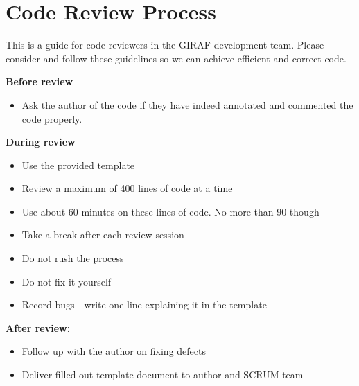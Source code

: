 \chapter{Code Review Process}\label{CRP}
This is a guide for code reviewers in the GIRAF development team. Please
consider and follow these guidelines so we can achieve efficient and correct
code.\nl

\textbf{Before review}
  \begin{itemize}
    \item Ask the author of the code if they have indeed annotated and commented
    the code properly.
  \end{itemize}
\textbf{During review}
  \begin{itemize}
    \item Use the provided template
    \item Review a maximum of 400 lines of code at a time
    \item Use about 60 minutes on these lines of code. No more than 90 though
    \item Take a break after each review session
    \item Do not rush the process
    \item Do not fix it yourself
    \item Record bugs - write one line explaining it in the template 
  \end{itemize}
\textbf{After review:}
  \begin{itemize}
    \item Follow up with the author on fixing defects
    \item Deliver filled out template document to author and SCRUM-team
  \end{itemize}
